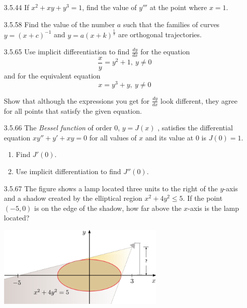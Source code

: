 \documentclass{article}
\begin{document}
\begin{enumerate}

\item[3.5.44]
    If $x^{2} + xy + y^{3} = 1$, find the value of $y'''$ at the point where $x = 1$.

\vspace{6cm}

\item[3.5.58]
    Find the value of the number $a$ such that the families of curves $y = (x + c)^{-1}$
    and $y = a(x+k)^{\frac{1}{3}}$ are orthogonal trajectories.

\vspace{6cm}

\item[3.5.65]
    Use implicit differentiation to find $\frac{dy}{dx}$ for the equation
    \[
        \frac{x}{y} = y^{2} + 1,\ y \neq 0
    \]
    and for the equivalent equation
    \[
        x = y^{3} + y,\ y \neq 0
    \]

    Show that although the expressions you get for $\frac{dy}{dx}$ look different,
    they agree for all points that satisfy the given equation.

\newpage

\item[3.5.66]
    The \textit{Bessel function} of order $0$, $y = J(x)$ , satisfies the differential
    equation $xy'' + y' + xy = 0$ for all values of $x$ and its value at $0$
    is $J(0) = 1$.
    \begin{enumerate}
        \item
            Find $J'(0)$.
        \item
            Use implicit differentiation to find $J''(0)$.
    \end{enumerate}

\vspace{6cm}

\item[3.5.67]
    The figure shows a lamp located three units to the right of the $y$-axis
    and a shadow created by the elliptical region $x^{2} + 4y^{2} \leq 5$.
    If the point $(-5, 0)$ is on the edge of the shadow, how far above the $x$-axis
    is the lamp located?

    \begin{center}
        \includegraphics[width=8cm]{./png/3.5.67.png}
    \end{center}


\end{enumerate}
\end{document}
